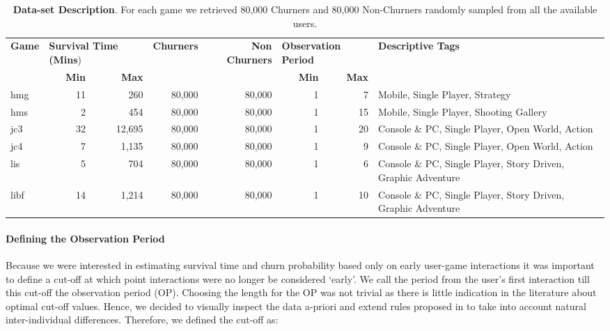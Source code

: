\begin{table}[h] \centering
\tabcolsep=1pt\relax
\caption{\textbf{Data-set Description}. For each game we retrieved 80,000 Churners and 80,000 Non-Churners randomly sampled from all the available users.}
\label{gamesdescription}
\begin{tabular}{@{}lrrrrrrl@{}}
\toprule

\multirow{2}{*}{\textbf{Game}} & \multicolumn{2}{l}{\textbf{Survival Time (Mins})} & \multirow{2}{*}{\textbf{Churners}} & \multirow{2}{*}{\textbf{Non Churners}} & \multicolumn{2}{l}{\textbf{Observation Period}} & \multirow{2}{*}{\textbf{Descriptive Tags}} \\ \cmidrule(lr){2-3} \cmidrule(lr){6-7}
                      & \textbf{Min}                  & \textbf{Max}                  &                           &                               & \textbf{Min}                & \textbf{Max}               &                                \\ \midrule
hmg                        & 11 & 260    & 80,000 & 80,000  & 1  & 7  & Mobile, Single Player, Strategy                       \\
hms                        & 2 & 454     & 80,000 & 80,000  & 1  & 15 & Mobile, Single Player, Shooting Gallery                \\
jc3                        & 32 & 12,695 & 80,000 & 80,000  & 1  & 20 & Console \& PC, Single Player, Open World, Action              \\
jc4                        & 7 & 1,135   & 80,000 & 80,000  & 1  & 9  & Console \& PC, Single Player, Open World, Action              \\
lis                        & 5 & 704     & 80,000 & 80,000  & 1  & 6  & Console \& PC, Single Player, Story Driven, Graphic Adventure \\
libf                       & 14 & 1,214  & 80,000 & 80,000  & 1  & 10 & Console \& PC, Single Player, Story Driven, Graphic Adventure \\ \bottomrule
\end{tabular}
\end{table}

\paragraph*{Defining the Observation Period}
Because we were interested in estimating survival time and churn probability based only on early user-game interactions it was important to define a cut-off at which point interactions were no longer be considered `early'. We call the period from the user's first interaction till this cut-off the observation period (OP). Choosing the length for the OP was not trivial as there is little indication in the literature about optimal cut-off values. Hence, we decided to visually inspect the data a-priori and extend rules proposed in \cite{drachen2016rapid, milovsevic2017early} to take into account natural inter-individual differences. Therefore, we defined the cut-off as:

